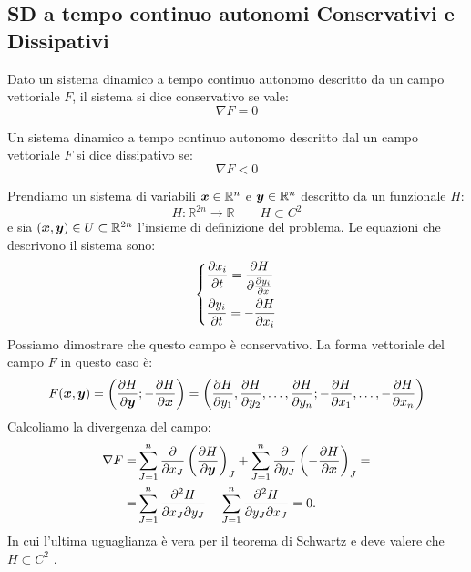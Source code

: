 \subsection{SD a tempo continuo autonomi Conservativi e Dissipativi}%
\label{sub:SD a tempo continuo autonomi Conservativi e Dissipativi}
\begin{defn}
    Dato un sistema dinamico a tempo continuo autonomo descritto da un campo vettoriale $F$, il sistema si dice conservativo se vale:
    \[
        \nabla F = 0
    \] 
\end{defn}
\noindent
\begin{defn}
    Un sistema dinamico a tempo continuo autonomo descritto dal un campo vettoriale $F$ si dice dissipativo se:
    \[
        \nabla F < 0
    \] 
\end{defn}
\noindent
\begin{exmp}
    Prendiamo un sistema di variabili $\boldsymbol{x}  \in \mathbb{R}^n$ e $\boldsymbol{y}\in \mathbb{R}^n$ descritto da un funzionale $H$: 
    \[
        H: \mathbb{R}^{2n}\to \mathbb{R} \qquad H \subset C^2
    \] 
    e sia $(\boldsymbol{x}, \boldsymbol{y})\in U \subset \mathbb{R}^{2n}$ l'insieme di definizione del problema. Le equazioni che descrivono il sistema sono:
    \[\begin{dcases}
        \frac{\partial x_i}{\partial t} = \frac{\partial H}{\partial \frac{\partial y_i}{\partial x} } \\
	\frac{\partial y_i}{\partial t} = - \frac{\partial H}{\partial x_i} 
    \end{dcases}\] 
    Possiamo dimostrare che questo campo è conservativo. La forma vettoriale del campo $F$ in questo caso è:
    \[
	F(\boldsymbol{x},\boldsymbol{y}) = \left(\frac{\partial H}{\partial \boldsymbol{y}} ; - \frac{\partial H}{\partial \boldsymbol{x}} \right) = 
	\left(\frac{\partial H}{\partial y_1}, \frac{\partial H}{\partial y_2}, \ldots, \frac{\partial H}{\partial y_n}; - \frac{\partial H}{\partial x_1}, \ldots,- \frac{\partial H}{\partial x_n}  \right)
    \] 
    Calcoliamo la divergenza del campo:
    \[\begin{aligned}
	\nabla F =& \sum_{J=1}^{n} \frac{\partial }{\partial x_J} \left(\frac{\partial H}{\partial \boldsymbol{y}} \right)_J +
	\sum_{J=1}^{n} \frac{\partial }{\partial y_J} \left(-\frac{\partial H}{\partial \boldsymbol{x}} \right)_J = \\
	=& \sum_{J=1}^{n} \frac{\partial ^2H}{\partial x_J\partial y_J} -\sum_{J=1}^{n} \frac{\partial ^2H}{\partial y_J\partial x_J} = 0
    .\end{aligned}\]
    In cui l'ultima uguaglianza è vera per il teorema di Schwartz e deve valere che $H\subset C^2$ .
\end{exmp}
